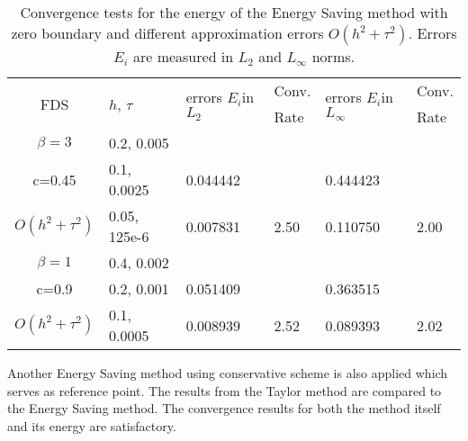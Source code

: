 \documentclass{article}
\begin{document}
\begin{table}[ht]
\centering
\small
		\begin{tabular}{||c|l|ll|ll||}
			\hline
			\hline
      \multirow{2  }{*}{FDS}        & \multirow{2  }{*}{$h$, $\tau$}  & \multirow{2  }{*}{errors $E_i$in$L_2$}  &Conv.& \multirow{2  }{*}{errors $E_i$in$L_\infty$}  &Conv.  \\
	                                        &                                                     &                                                                 &  Rate &                                                                       & Rate \\
   			\hline 
					\hline 
  $\beta=3$                &0.2, 0.005         &                    &                &                  &                   \\
   c=0.45                     &0.1, 0.0025         & 0.044442   &                & 0.444423  &                   \\
     $O(h^2 + \tau^ 2)$ &0.05, 125e-6  & 0.007831   & 2.50       & 0.110750  & 2.00   \\
	   \hline
			\hline 
       $\beta=1$           & 0.4, 0.002       &                   &           &                 &   \\
                  c=0.9       & 0.2, 0.001        & 0.051409   &          &0.363515  &   \\
  $O(h^2+ \tau^2)$  & 0.1, 0.0005       & 0.008939   & 2.52  &0.089393  & 2.02  \\
	   \hline
			\hline 
		\end{tabular}
		\caption{ Convergence tests for the energy of the Energy Saving method with zero boundary and different approximation errors $O(h^{2} + \tau^2 )$. Errors $E_i$ are measured in $L_2$ and $L_\infty$ norms. }
\label{tableD}
\end{table}

Another Energy Saving method using conservative scheme is also applied which serves as reference point. The results from the Taylor method are compared to the Energy Saving method. The convergence results for both the method itself and its energy are satisfactory.
\end{document}
